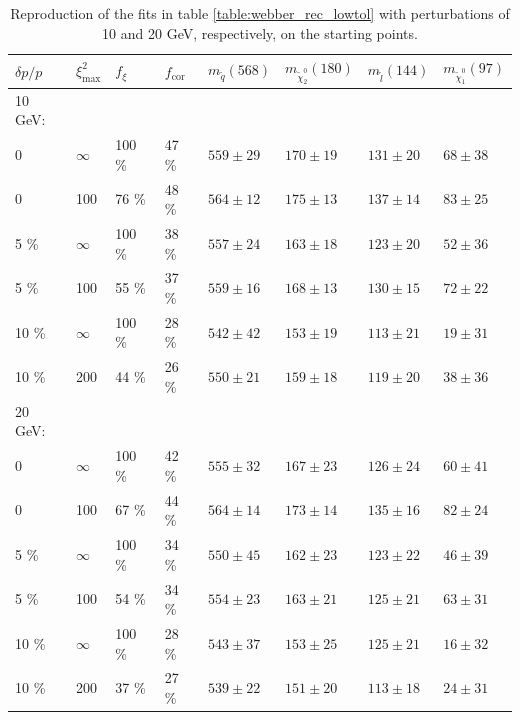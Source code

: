 \documentclass[twoside,english]{uiofysmaster}
\begin{document}
\begin{table}[hbt]
	\centering
	\begin{tabular}{| l | l | l | l  || l | l | l | l |}
		\hline
		$\delta p/p$ & $\xi^2_\mathrm{max}$ & $f_\xi$ & $f_\mathrm{cor}$ & $m_{\tilde q} (568)$ & $m_{\tilde \chi_2^0} (180)$ & $m_{\tilde l} (144)$ & $m_{\tilde \chi_1^0} (97)$ \\
		\hline \hline
		10 GeV: & & & & & & & \\ 
		\hline
		0 & 	$\infty$ &	100 \%	& 47 \%	& $559 \pm 29$	&	$170 \pm 19$	&	$131 \pm 20$	& 	$68 \pm 38$	\\
		0 &		100 &		76 \%	& 48 \% & $564 \pm 12$	&	$175 \pm 13$		&	$137 \pm 14$	&	$83 \pm 25$	\\
		5 \% &	$\infty$ &	100 \%	& 38 \% & $557 \pm 24$	& 	$163 \pm 18$	&	$123 \pm 20$&	$52 \pm 36$ \\
		5 \% &	100 &		55 \%	& 37 \% & $559 \pm 16$	&	$168 \pm 13$	& 	$130 \pm 15$	&	$72 \pm 22$	\\
		10 \% &	$\infty$ &	100 \%	& 28 \% & $542 \pm 42$	&	$153 \pm 19$	&	$113 \pm 21$&	$19 \pm 31$	\\
		10 \% &	200 &		44 \%	& 26 \% & $550 \pm 21$	& 	$159 \pm 18$	&	$119 \pm 20$&	$38 \pm 36$ \\
		\hline
		20 GeV: & & & & & & & \\ 
		\hline
		0 & 	$\infty$ &	100 \%	& 42 \%	& $555 \pm 32$	&	$167 \pm 23$	&	$126 \pm 24$	& 	$60 \pm 41$	\\
		0 &		100 &		67 \%	& 44 \% & $564 \pm 14$	&	$173 \pm 14$	&	$135 \pm 16$	&	$82 \pm 24$	\\
		5 \% &	$\infty$ &	100 \%	& 34 \% & $550 \pm 45$	& 	$162 \pm 23$	&	$123 \pm 22$&	$46 \pm 39$ \\
		5 \% &	100 &		54 \%	& 34 \% & $554 \pm 23$	&	$163 \pm 21$	& 	$125 \pm 21$	&	$63 \pm 31$	\\
		10 \% &	$\infty$ &	100 \%	& 28 \% & $543 \pm 37$	&	$153 \pm 25$	&	$125 \pm 21$&	$16 \pm 32$	\\
		10 \% &	200 &		37 \%	& 27 \% & $539 \pm 22$	& 	$151 \pm 20$	&	$113 \pm 18$&	$24 \pm 31$ \\
		\hline
	\end{tabular}
	\caption{Reproduction of the fits in table \ref{table:webber_rec_lowtol} with perturbations of 10 and 20 GeV, respectively, on the starting points.}
	\label{table:webber_rec_lowtol_perturbedSP}
\end{table}



\end{document}
